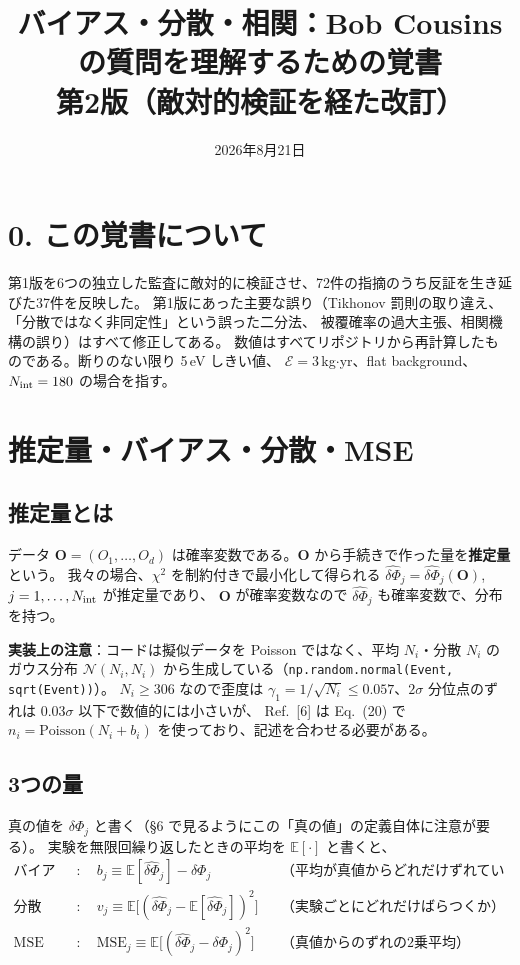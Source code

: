 \documentclass[11pt,a4paper]{ltjsarticle}
\title{\vspace{-14mm}バイアス・分散・相関：Bob Cousins の質問を理解するための覚書\\
\large 第2版（敵対的検証を経た改訂）\vspace{-3mm}}
\author{}\date{2026年8月21日}
\newcommand{\dP}{\delta\Phi}
\newcommand{\dPh}{\widehat{\delta\Phi}}
\newcommand{\E}{\mathbb{E}}
\newcommand{\Nint}{N_{\rm int}}
\begin{document}
\maketitle\vspace{-10mm}

\section*{0. この覚書について}
第1版を6つの独立した監査に敵対的に検証させ、72件の指摘のうち反証を生き延びた37件を反映した。
第1版にあった主要な誤り（Tikhonov 罰則の取り違え、「分散ではなく非同定性」という誤った二分法、
被覆確率の過大主張、相関機構の誤り）はすべて修正してある。
数値はすべてリポジトリから再計算したものである。断りのない限り 5\,eV しきい値、
$\mathcal{E}=3$\,kg$\cdot$yr、flat background、$\Nint=180$ の場合を指す。

\section{推定量・バイアス・分散・MSE}

\subsection*{推定量とは}
データ $\bm O=(O_1,\dots,O_d)$ は確率変数である。$\bm O$ から手続きで作った量を\textbf{推定量}という。
我々の場合、$\chi^2$ を制約付きで最小化して得られる $\dPh_j=\dPh_j(\bm O)$, $j=1,\dots,\Nint$ が推定量であり、
$\bm O$ が確率変数なので $\dPh_j$ も確率変数で、分布を持つ。

\textbf{実装上の注意}：コードは擬似データを Poisson ではなく、平均 $N_i$・分散 $N_i$ のガウス分布
$\mathcal N(N_i,N_i)$ から生成している（\texttt{np.random.normal(Event,\,sqrt(Event))}）。
$N_i\ge306$ なので歪度は $\gamma_1=1/\sqrt{N_i}\le0.057$、$2\sigma$ 分位点のずれは $0.03\sigma$ 以下で数値的には小さいが、
Ref.~[6] は Eq.~(20) で $n_i=\mathrm{Poisson}(N_i+b_i)$ を使っており、記述を合わせる必要がある。

\subsection*{3つの量}
真の値を $\dP_j$ と書く（\S6 で見るようにこの「真の値」の定義自体に注意が要る）。
実験を無限回繰り返したときの平均を $\E[\cdot]$ と書くと、
\begin{align}
\text{バイアス}&:\quad b_j \equiv \E[\dPh_j]-\dP_j
&&\text{（平均が真値からどれだけずれているか）}\\
\text{分散}&:\quad v_j \equiv \E\big[(\dPh_j-\E[\dPh_j])^2\big]
&&\text{（実験ごとにどれだけばらつくか）}\\
\text{MSE}&:\quad \mathrm{MSE}_j \equiv \E\big[(\dPh_j-\dP_j)^2\big]
&&\text{（真値からのずれの2乗平均）}
\end{align}
\end{document}
